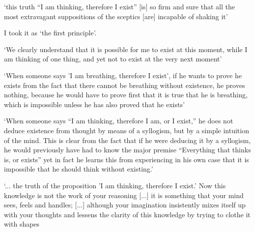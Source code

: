 \documentclass[12pt]{extarticle}
\begin{document}
\begin{multicols*}{3}
‘this truth
“I am thinking, therefore I exist”
[is] so firm and sure 
that all the most extravagant suppositions of the sceptics [are] incapable of shaking it’
 
I took it as ‘the first principle’.
\citep[p.~126 AT 6:31]{descartes:1985_csm1}
 
‘We clearly understand that it is possible for me to exist at this moment, while I am thinking of
one thing, and yet not to exist at the very next moment’
\citep[p.~355 AT V:192]{descartes:1984_vol3}
 
‘When someone says 'I am breathing, therefore I exist', if he wants to prove he exists from the fact
that there cannot be breathing without existence, he proves nothing, because he would have to prove
first that it is true that he is breathing, which is impossible unless he has also proved that 
he exists’ 
\citep[p.~98 AT II:37]{descartes:1984_vol3}
 
‘When someone says “I am thinking, therefore I am, or I exist,” he does not deduce existence from thought by means of a syllogism, but by a simple intuition of the mind.  
This is clear from the fact that if he were deducing it by a syllogism, he would
previously have had to know the major premise “Everything that thinks is, or exists”
yet in fact
he learns this from experiencing in his own case that it is impossible that he should think
without existing.’
\citep[AT 7:140]{descartes:1985_csm2}
 
‘...  the truth of the proposition 'I am thinking, therefore I exist.' 
Now this knowledge is not the work
of your reasoning
[...] it is something that your mind sees,
feels and handles; 
[...] although your imagination insistently mixes itself up with your thoughts
and lessens the clarity of this knowledge by trying to clothe it with shapes
\citep[p.~331 AT V:138]{descartes:1984_vol3}
 

    







\footnotesize


\end{multicols*}
\end{document}
